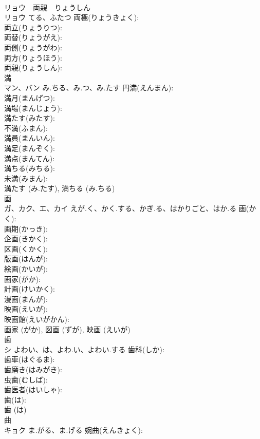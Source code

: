 \documentclass[8pt]{extreport}
\begin{document}
\begin{CJK}{UTF8}{min}
\\	リョウ　両親　りょうしん
\\	リョウ	てる、ふたつ	両極(りょうきょく): 
\\	両立(りょうりつ): 
\\	両替(りょうがえ): 
\\	両側(りょうがわ): 
\\	両方(りょうほう): 
\\	両親(りょうしん): 
\\	満			
\\	マン、バン	み.ちる、み.つ、み.たす	円満(えんまん): 
\\	満月(まんげつ): 
\\	満場(まんじょう): 
\\	満たす(みたす): 
\\	不満(ふまん): 
\\	満員(まんいん): 
\\	満足(まんぞく): 
\\	満点(まんてん): 
\\	満ちる(みちる): 
\\	未満(みまん): 
\\	満たす (み.たす), 満ちる (み.ちる)
\\	画			
\\	ガ、カク、エ、カイ	えが.く、かく.する、かぎ.る、はかりごと、はか.る	画(かく): 
\\	画期(かっき): 
\\	企画(きかく): 
\\	区画(くかく): 
\\	版画(はんが): 
\\	絵画(かいが): 
\\	画家(がか): 
\\	計画(けいかく): 
\\	漫画(まんが): 
\\	映画(えいが): 
\\	映画館(えいがかん): 
\\	画家 (がか), 図画 (ずが), 映画 (えいが)
\\	歯			
\\	シ	よわい、は、よわ.い、よわい.する	歯科(しか): 
\\	歯車(はぐるま): 
\\	歯磨き(はみがき): 
\\	虫歯(むしば): 
\\	歯医者(はいしゃ): 
\\	歯(は): 
\\	歯 (は)
\\	曲			
\\	キョク	ま.がる、ま.げる	婉曲(えんきょく): 

\end{CJK}
\end{document}
